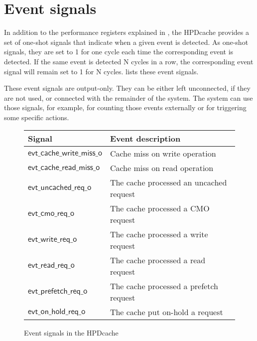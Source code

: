\documentclass[10pt,titlepage,twoside]{book}
\begin{document}
\section{Event signals}

In addition to the performance registers explained in , the \ac{HPDcache} provides a set of one-shot signals that indicate when a given event is detected.
As one-shot signals, they are set to 1 for one cycle each time the corresponding event is detected.
If the same event is detected N cycles in a row, the corresponding event signal will remain set to 1 for N cycles.
 lists these event signals.

These event signals are output-only.
They can be either left unconnected, if they are not used, or connected with the remainder of the system.
The system can use those signals, for example, for counting those events externally or for triggering some specific actions.

\begin{figure}[!htbp]
  \begin{center}
    \caption{Event signals in the \ac*{HPDcache}}%
    {\footnotesize%
    \begin{tabular}{ll}
      \toprule
      \textbf{Signal}
      & \textbf{Event description} \\
      \midrule
      $\mathsf{evt\_cache\_write\_miss\_o}$
      & Cache miss on write operation\\
      \midrule
      $\mathsf{evt\_cache\_read\_miss\_o}$
      & Cache miss on read operation\\
      \midrule
      $\mathsf{evt\_uncached\_req\_o}$
      & The cache processed an uncached request\\
      \midrule
      $\mathsf{evt\_cmo\_req\_o}$
      & The cache processed a \ac{CMO} request\\
      \midrule
      $\mathsf{evt\_write\_req\_o}$
      & The cache processed a write request\\
      \midrule
      $\mathsf{evt\_read\_req\_o}$
      & The cache processed a read request\\
      \midrule
      $\mathsf{evt\_prefetch\_req\_o}$
      & The cache processed a prefetch request\\
      \midrule
      $\mathsf{evt\_on\_hold\_req\_o}$
      & The cache put on-hold a request\\
      \bottomrule
  \end{tabular}}
  \end{center}
\end{figure}
\end{document}
